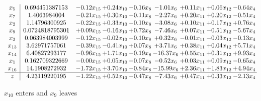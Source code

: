 \documentclass[9pt]{article}
\begin{document}
 \[\begin{array}{c| c c@{\hskip 2pt} c@{\hskip 2pt} c@{\hskip 2pt} c@{\hskip 2pt} c@{\hskip 2pt} c@{\hskip 2pt} c@{\hskip 2pt} }
 x_{5}   &  0.694451387153 & -0.12 x_{15} & +  0.24 x_{10} & -0.16 x_{8} & -1.01 x_{6} & +  0.11 x_{11} & +  0.06 x_{12} & -0.64 x_{4}\\
 x_{7}   &  1.4063984004 & -0.21 x_{15} & +  0.30 x_{10} & -0.11 x_{8} & -2.27 x_{6} & +  0.20 x_{11} & +  0.20 x_{12} & -0.51 x_{4}\\
 x_{2}   &  1.14796300925 & -0.22 x_{15} & +  0.33 x_{10} & -0.10 x_{8} & -3.08 x_{6} & +  0.10 x_{11} & +  0.17 x_{12} & +  0.76 x_{4}\\
 x_{9}   &  0.0724818795301 & +  0.09 x_{15} & -0.16 x_{10} & +  0.72 x_{8} & -7.46 x_{6} & +  0.07 x_{11} & -0.51 x_{12} & -5.67 x_{4}\\
 x_{3}   &  0.063984003999 & -0.12 x_{15} & -0.02 x_{10} & -0.10 x_{8} & +  0.32 x_{6} & -0.01 x_{11} & -0.03 x_{12} & -0.13 x_{4}\\
 x_{13}   &  3.62971757061 & -0.39 x_{15} & -0.41 x_{10} & +  0.07 x_{8} & +  3.71 x_{6} & +  0.38 x_{11} & +  0.04 x_{12} & +  5.71 x_{4}\\
 x_{14}   &  6.40827293177 & -0.96 x_{15} & +  1.71 x_{10} & -0.19 x_{8} & -16.37 x_{6} & +  0.55 x_{11} & +  0.31 x_{12} & +  9.93 x_{4}\\
 x_{1}   &  0.162709322669 & -0.00 x_{15} & +  0.05 x_{10} & -0.07 x_{8} & -0.52 x_{6} & +  0.03 x_{11} & +  0.09 x_{12} & -0.65 x_{4}\\
 x_{16}   &  14.1908272932 & -1.72 x_{15} & +  3.70 x_{10} & -0.84 x_{8} & -15.99 x_{6} & +  2.36 x_{11} & +  1.83 x_{12} & +  4.94 x_{4}\\
\hline
z    &  4.23119220195 & -1.22 x_{15} & +  0.52 x_{10} & -0.47 x_{8} & -7.43 x_{6} & +  0.47 x_{11} & +  0.33 x_{12} & -2.13 x_{4}\\
\end{array}\]


 $ x_{10} $ enters and $ x_{9} $ leaves 
\end{document}
